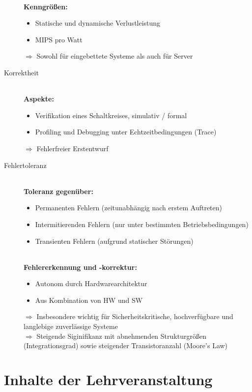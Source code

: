 \begin{description}
			\hfill\\\textbf{Kenngrößen:}
			\begin{itemize}
				\item Statische und dynamische Verlustleistung
				\item MIPS pro Watt
			\end{itemize}

			$\Rightarrow$ Sowohl für eingebettete Systeme als auch für Server


		\item[Korrektheit]
			\hfill\\\textbf{Aspekte:}
			\begin{itemize}
				\item Verifikation eines Schaltkreises, simulativ / formal
				\item Profiling und Debugging unter Echtzeitbedingungen (Trace)
			\end{itemize}
			$\Rightarrow$ Fehlerfreier Erstentwurf


		\item[Fehlertoleranz]\hfill
			\\\textbf{Toleranz gegenüber:}
			\begin{itemize}
				\item Permanenten Fehlern (zeitunabhängig nach erstem Auftreten)
				\item Intermitierenden Fehlern (nur unter bestimmten Betriebsbedingungen)
				\item Transienten Fehlern (aufgrund statischer Störungen)
			\end{itemize}

			\hfill\\\textbf{Fehlererkennung und -korrektur:}
			\begin{itemize}
				\item Autonom durch Hardwarearchitektur
				\item Aus Kombination von HW und SW
			\end{itemize}

			$\Rightarrow$ Insbesondere wichtig für Sicherheitskritische, hochverfügbare und langlebige zuverlässige Systeme
			\\$\Rightarrow$ Steigende Siginifikanz mit abnehmenden Strukturgrößen (Integrationsgrad) sowie steigender Transistoranzahl (Moore's Law)
	\end{description}


\section{Inhalte der Lehrveranstaltung}
